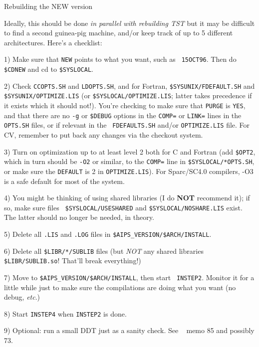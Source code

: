 \newsubsection Rebuilding the NEW version

Ideally, this should be done {\it in parallel with rebuilding TST\/} but
it may be difficult to find a second guinea-pig machine, and/or keep
track of up to 5 different architectures.  Here's a checklist:

\item{1)} Make sure that {\tt NEW} points to what you want, such as {\tt
	  15OCT96}.  Then do {\tt\$CDNEW} and cd to {\tt \$SYSLOCAL}.
\item{2)} Check {\tt CCOPTS.SH} and {\tt LDOPTS.SH}, and for Fortran,
	  {\tt\$SYSUNIX/FDEFAULT.SH} and {\tt\$SYSUNIX/OP\-TIM\-IZE.LIS}
	  (or {\tt\$SYSLOCAL/OPTI\-MIZE.LIS}; latter takes precedence if
	  it exists which it should not!).  You're checking to make sure
	  that {\tt PURGE} is {\tt YES}, and that there are no {\tt -g}
	  or {\tt \$DEBUG} options in the {\tt COMP=} or {\tt LINK=}
	  lines in the {\tt *OPTS.SH} files, or if relevant in the {\tt
	  FDEFAULTS.SH} and/or {\tt OPTIMIZE.LIS} file.  For CV,
	  remember to put back any changes via the checkout system.
\item{3)} Turn on optimization up to at least level 2 both for C and
	  Fortran (add {\tt \$OPT2}, which in turn should be {\tt -O2}
	  or similar, to the {\tt COMP=} line in
	  {\tt\$SYSLOCAL/*OPTS.SH}, or make sure the {\tt DEFAULT} is 2
	  in {\tt OPTIMIZE.LIS}).  For Sparc/SC4.0 compilers, -O3 is a
	  safe default for most of the system.
\item{4)} You might be thinking of using shared libraries (I do {\bf
	  NOT} recommend it); if so, make sure files {\tt
	  \$SYSLOCAL/USESHARED} and {\tt\$SYSLOCAL/NOSHARE.LIS} exist.
	  The latter should no longer be needed, in theory.
\item{5)} Delete all {\tt .LIS} and {\tt .LOG} files in
	  {\tt\$AIPS\_VERSION/\$ARCH/INSTALL}.
\item{6)} Delete all {\tt\$LIBR/*/SUBLIB} files (but {\it NOT\/} any
	  shared libraries {\tt \$LIBR/SUBLIB.so}!  That'll break
	  everything!)
\item{7)} Move to {\tt \$AIPS\_VERSION/\$ARCH/INSTALL}, then start {\tt
	  INSTEP2}.  Monitor it for a little while just to make sure the
	  compilations are doing what you want (no debug, {\it etc\/}.)
\item{8)} Start {\tt INSTEP4} when {\tt INSTEP2} is done.
\item{9)} Optional: run a small DDT just as a sanity check.  See \AIPS~
	  memo 85 and possibly 73.

